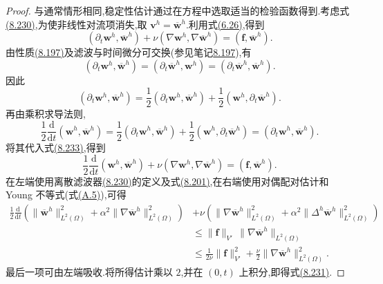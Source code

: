 \begin{lemma}
\begin{proof}
与通常情形相同,稳定性估计通过在方程中选取适当的检验函数得到.考虑式\hyperref[eq:navier-stokes-alpha-fem-velocity-only]{(8.230)},为使非线性对流项消失,取 $\bm{v}^h=\overline{\bm{w}}^h$.利用式\hyperref[eq:steady-ns-convection-zero-rot-skew]{(6.26)},得到
\begin{equation}\label{eq:navier-stokes-alpha-fem-energy-test}
 (\partial_t\bm{w}^h,\overline{\bm{w}}^h)
  +\nu(\nabla\bm{w}^h,\nabla\overline{\bm{w}}^h)
  =(\bm{f},\overline{\bm{w}}^h).
\end{equation}
由性质\hyperref[eq:leray-alpha-discrete-filter-self-adjoint]{(8.197)}及滤波与时间微分可交换(参见笔记\hyperref[note:navier-stokes-alpha-analysis-setup]{8.197}),有
\[
 (\partial_t\bm{w}^h,\overline{\bm{w}}^h)
  =(\partial_t\overline{\bm{w}}^h,\bm{w}^h)
  =(\partial_t\overline{\bm{w}}^h,\overline{\bm{w}}^h).
\]
因此
\[
 (\partial_t\bm{w}^h,\overline{\bm{w}}^h)
 =\frac12(\partial_t\bm{w}^h,\overline{\bm{w}}^h)
  +\frac12(\bm{w}^h,\partial_t\overline{\bm{w}}^h).
\]
再由乘积求导法则,
\[
 \frac12\frac{\mathrm{d}}{\mathrm{d}t}
   (\bm{w}^h,\overline{\bm{w}}^h)
 =\frac12(\partial_t\bm{w}^h,\overline{\bm{w}}^h)
  +\frac12(\bm{w}^h,\partial_t\overline{\bm{w}}^h)
 =(\partial_t\bm{w}^h,\overline{\bm{w}}^h).
\]
将其代入式\hyperref[eq:navier-stokes-alpha-fem-energy-test]{(8.233)},得到
\begin{equation}\label{eq:navier-stokes-alpha-fem-energy-identity}
 \frac12\frac{\mathrm{d}}{\mathrm{d}t}
    (\bm{w}^h,\overline{\bm{w}}^h)
  +\nu(\nabla\bm{w}^h,\nabla\overline{\bm{w}}^h)
  =(\bm{f},\overline{\bm{w}}^h).
\end{equation}
在左端使用离散滤波器\hyperref[eq:navier-stokes-alpha-fem-velocity-only]{(8.230)}的定义及式\hyperref[eq:leray-alpha-discrete-filter-H1-identity]{(8.201)},在右端使用对偶配对估计和 Young 不等式(式\hyperref[eq:appendix-a-5]{(A.5)}),可得
\[
\begin{aligned}
 \frac12\frac{\mathrm{d}}{\mathrm{d}t}
  \left(\|\overline{\bm{w}}^h\|_{L^2(\Omega)}^2
       +\alpha^2\|\nabla\overline{\bm{w}}^h\|_{L^2(\Omega)}^2\right)
 &+\nu\left(\|\nabla\overline{\bm{w}}^h\|_{L^2(\Omega)}^2
       +\alpha^2\|\Delta^h\overline{\bm{w}}^h\|_{L^2(\Omega)}^2\right)\\
 &\le \|\bm{f}\|_{V'}\,
       \|\nabla\overline{\bm{w}}^h\|_{L^2(\Omega)}\\
 &\le \frac{1}{2\nu}\|\bm{f}\|_{V'}^2
       +\frac{\nu}{2}\|\nabla\overline{\bm{w}}^h\|_{L^2(\Omega)}^2.
\end{aligned}
\]
最后一项可由左端吸收.将所得估计乘以 $2$,并在 $(0,t)$ 上积分,即得式\hyperref[eq:navier-stokes-alpha-fem-stability-filtered]{(8.231)}.


\end{proof}
\end{lemma}
